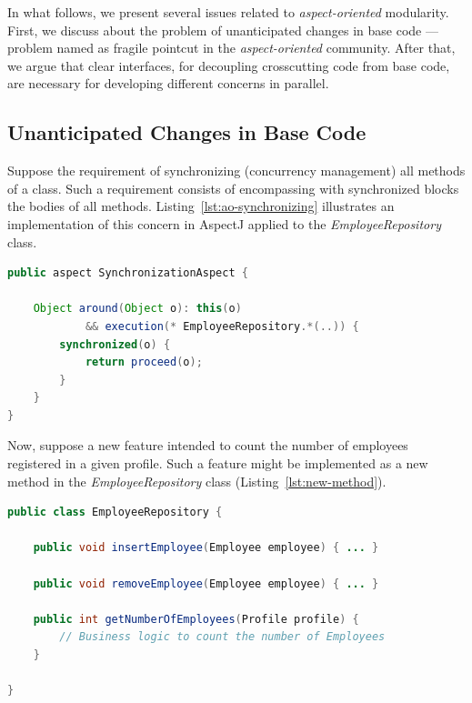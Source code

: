 In what follows, we present several issues related to \emph{aspect-oriented} 
modularity. First, we discuss about the problem of unanticipated changes 
in base code --- problem named as fragile pointcut in the \emph{aspect-oriented} community. After that, 
we argue that clear interfaces, for decoupling crosscutting code from base 
code, are necessary for developing different concerns in parallel.    

\subsection{Unanticipated Changes in Base Code}

Suppose the requirement of synchronizing (concurrency management)
all methods of a class. Such a requirement consists of encompassing
with synchronized blocks the bodies of all methods.
Listing~\ref{lst:ao-synchronizing} illustrates an implementation of
this concern in AspectJ applied to the \emph{EmployeeRepository}
class.

\scriptsize
\begin{lstlisting}[frame=single, caption={Aspect responsible for implementing the concurrency concern.},label=lst:ao-synchronizing, language=Java]
public aspect SynchronizationAspect {

    Object around(Object o): this(o)
            && execution(* EmployeeRepository.*(..)) {
        synchronized(o) {
            return proceed(o);
        }
    }
}
\end{lstlisting}
\normalsize

Now, suppose a new feature intended to count the number of employees
registered in a given profile. Such a feature might be implemented as
a new method in the \emph{EmployeeRepository} class
(Listing~\ref{lst:new-method}).

\scriptsize
\begin{lstlisting}[frame=single, caption={A new method for counting the number of Employees.},label=lst:new-method, language=Java]
public class EmployeeRepository {

    public void insertEmployee(Employee employee) { ... }

    public void removeEmployee(Employee employee) { ... }

    public int getNumberOfEmployees(Profile profile) {
        // Business logic to count the number of Employees
    }

}
\end{lstlisting}
\normalsize

